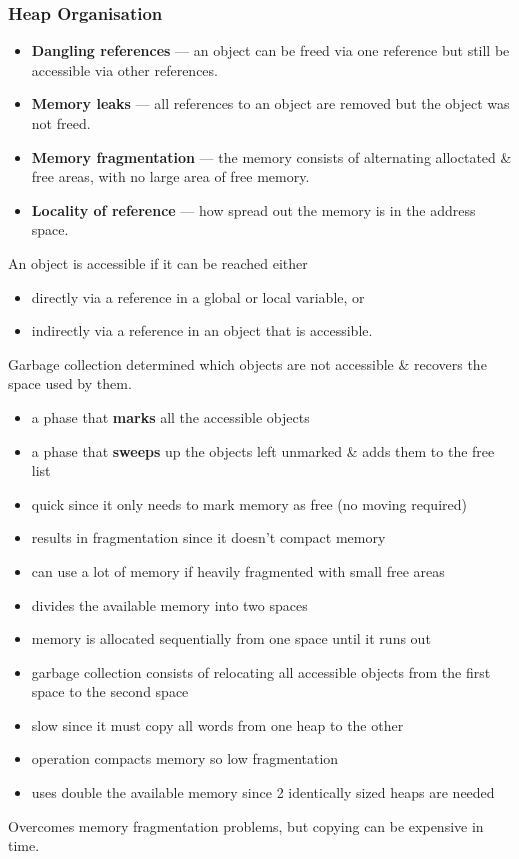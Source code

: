 \subsubsection{Heap Organisation}
\begin{itemize}
    \item \textbf{Dangling references} --- an object can be freed via one reference but 
    still be accessible via other references.
    \item \textbf{Memory leaks} --- all references to an object are removed but the object 
    was not freed.
    \item \textbf{Memory fragmentation} --- the memory consists of alternating alloctated 
    \& free areas, with no large area of free memory.
    \item \textbf{Locality of reference} --- how spread out the memory is in the address space.
\end{itemize}

An object is accessible if it can be reached either
\begin{itemize}
    \item directly via a reference in a global or local variable, or
    \item indirectly via a reference in an object that is accessible.
\end{itemize}
Garbage collection determined which objects are not accessible \& recovers the space used 
by them.

\begin{itemize}
    \item a phase that \textbf{marks} all the accessible objects
    \item a phase that \textbf{sweeps} up the objects left unmarked \& adds them to the 
    free list
    \item quick since it only needs to mark memory as free (no moving required)
    \item results in fragmentation since it doesn't compact memory
    \item can use a lot of memory if heavily fragmented with small free areas
\end{itemize}

\begin{itemize}
    \item divides the available memory into two spaces
    \item memory is allocated sequentially from one space until it runs out
    \item garbage collection consists of relocating all accessible objects from the first 
    space to the second space
    \item slow since it must copy all words from one heap to the other
    \item operation compacts memory so low fragmentation
    \item uses double the available memory since 2 identically sized heaps are needed
\end{itemize}
Overcomes memory fragmentation problems, but copying can be expensive in time.

